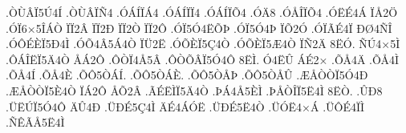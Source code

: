 {.^^d2^^d9^^c2^^cf5^^da4^^cd
.^^d2^^d9^^c2^^cf^^d14
.^^d3^^c1^^cd^^cf^^c14
.^^d3^^c1^^cd^^cf^^cf4
.^^d3^^c1^^cd^^cf^^d54
.^^d3^^c48
.^^d3^^c5^^ce^^cf^^d54
.^^d3^^cb^^c94^^c1
^^cf^^c52^^d6
.^^d3^^cf6^^d75^^ce^^c1^^d2
^^cf^^cf2^^c2
^^cf^^cf2^^d0
^^cf^^cf2^^d2
^^cf^^cf2^^d4
.^^d3^^cf5^^d34^^cb^^d5^^de
.^^d3^^cf5^^d34^^de
^^cf^^d52^^d3
.^^d3^^cf^^c3^^c94^^cf
^^d0^^d84^^d1^^ce
.^^d3^^d4^^c9^^c8^^cf5^^d04^^cc
.^^d3^^d54^^c25^^c14^^d2
^^cf^^dc2^^cb
.^^d3^^d5^^c8^^cf5^^c74^^d2
.^^d3^^d5^^c8^^cf5^^c64^^d2
^^cf^^d12^^c4
8^^cb^^d3.
^^d1^^da4^^d75^^cc
.^^d4^^c1^^ce^^cb^^cf5^^c44^^d2
^^c5^^c12^^d4
.^^d4^^d2^^cf4^^c55^^c2
.^^d4^^d2^^d5^^c2^^cf5^^d34^^d4
8^^cb^^cc.
^^d34^^cb^^db
^^c1^^c92^^d7
.^^d5^^c54^^c4
.^^d5^^c54^^cc
.^^d5^^c54^^cd
.^^d5^^c54^^c8
.^^d5^^d45^^d2^^c1^^cd.
.^^d5^^d45^^d2^^c1^^c8.
.^^d5^^d45^^d2^^c5^^de
.^^d5^^d45^^d2^^c5^^db
.^^c6^^c5^^d2^^d2^^cf5^^d34^^d0
.^^c6^^c5^^d2^^d2^^cf5^^c84^^d2
^^cf^^c12^^d4
^^c5^^d52^^c2
.^^c3^^c9^^cb^^cc^^cf5^^c44^^d2
.^^de^^c14^^c55^^c8^^cc
.^^de^^c5^^d2^^ce^^cf5^^cb4^^cc
8^^cb^^d2.
.^^db^^d08
.^^dc^^cb^^da^^cf5^^d34^^d4
^^c4^^db4^^d0
.^^dc^^d0^^c95^^c74^^cc
^^c4^^c94^^c1^^d3^^cb
.^^dc^^d0^^c95^^cb4^^d2
.^^dc^^d3^^cb4^^d7^^c1
.^^dc^^d4^^c94^^cf^^cc
.^^d1^^ca^^c3^^c55^^cb4^^cc
}
